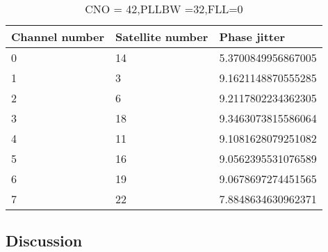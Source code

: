\begin{table}[!htb]
\centering
\begin{tabular}{|l|l|l|}
\hline
\rowcolor[HTML]{C0C0C0} 
Channel number & Satellite number & Phase jitter       \\ \hline
0              & 14               & 5.3700849956867005 \\ \hline
\rowcolor[HTML]{EFEFEF} 
1              & 3                & 9.1621148870555285 \\ \hline
2              & 6                & 9.2117802234362305 \\ \hline
\rowcolor[HTML]{EFEFEF} 
3              & 18               & 9.3463073815586064 \\ \hline
4              & 11               & 9.1081628079251082 \\ \hline
\rowcolor[HTML]{EFEFEF} 
5              & 16               & 9.0562395531076589 \\ \hline
6              & 19               & 9.0678697274451565 \\ \hline
\rowcolor[HTML]{EFEFEF} 
7              & 22               & 7.8848634630962371 \\ \hline
\end{tabular}
\caption{CNO = 42,PLLBW =32,FLL=0}
\label{my-label}
\end{table}

\clearpage
\subsection{Discussion}




